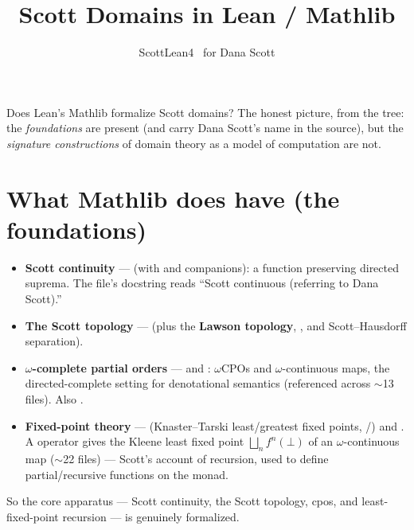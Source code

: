 \documentclass[11pt]{article}
\title{Scott Domains in Lean / Mathlib}
\author{ScottLean4 \textperiodcentered\ for Dana Scott}
\date{}
\begin{document}
\maketitle

Does Lean's Mathlib formalize Scott domains? The honest picture, from the
 tree: the \emph{foundations} are present (and carry Dana Scott's
name in the source), but the \emph{signature constructions} of domain theory as a
model of computation are not.

\section*{What Mathlib does have (the foundations)}
\begin{itemize}
  \item \textbf{Scott continuity} ---  (with
     and  companions): a function preserving directed
    suprema. The file's docstring reads ``Scott continuous (referring to Dana
    Scott).''
  \item \textbf{The Scott topology} --- 
    (plus the \textbf{Lawson topology}, , and
    Scott--Hausdorff separation).
  \item \textbf{$\omega$-complete partial orders} ---
     and
    : $\omega$CPOs and
    $\omega$-continuous maps, the directed-complete setting for denotational
    semantics (referenced across $\sim$13 files). Also
    .
  \item \textbf{Fixed-point theory} --- 
    (Knaster--Tarski least/greatest fixed points, /)
    and . A  operator gives the
    Kleene least fixed point $\bigsqcup_n f^n(\bot)$ of an $\omega$-continuous
    map ($\sim$22 files) --- Scott's account of recursion, used to define
    partial/recursive functions on the  monad.
\end{itemize}

So the core apparatus --- Scott continuity, the Scott topology, cpos, and
least-fixed-point recursion --- is genuinely formalized.
\end{document}
